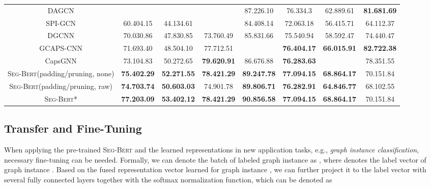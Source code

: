 \documentclass{article}
\newcommand{\our}{\textsc{Seg-Bert}}
\begin{document}
\begin{table*}[t]
\begin{tabular}{c|c|c|c|c|c|c|c}
\hline

DAGCN {\scriptsize \cite{Chen_Dual_19}}	&&&&87.226.10	&76.334.3	&62.889.61	&\textbf{81.681.69}\\

SPI-GCN {\scriptsize \cite{SPIGCN}} &60.404.15	&44.134.61	&	&84.408.14	&72.063.18	&56.415.71	&64.112.37\\

DGCNN {\scriptsize \cite{Zhang2018AnED}} &70.030.86&47.830.85 &73.760.49&85.831.66&75.540.94&58.592.47&74.440.47 \\

GCAPS-CNN {\scriptsize \cite{verma2018graph}} &71.693.40 &48.504.10 &77.712.51&&\textbf{76.404.17}&\textbf{66.015.91}&\textbf{82.722.38} \\

CapsGNN {\scriptsize \cite{xinyi2018capsule}} &73.104.83 &50.272.65 &\textbf{79.620.91}&86.676.88&\textbf{76.283.63}&&78.351.55 \\

\hline



{\our}(padding/pruning, none) &\textbf{75.402.29}&\textbf{52.271.55}&\textbf{78.421.29}&\textbf{89.247.78}&\textbf{77.094.15}&\textbf{68.864.17}&70.151.84 \\

{\our}(padding/pruning, raw) &\textbf{74.703.74}&\textbf{50.603.03}&74.901.78&\textbf{89.806.71}&\textbf{76.282.91}&\textbf{64.846.77}&68.102.55 \\

\hline

{\our}* &\textbf{77.203.09}&\textbf{53.402.12}&\textbf{78.421.29}&\textbf{90.856.58}&\textbf{77.094.15}&\textbf{68.864.17}&70.151.84\\

\hline
\end{tabular}
\vspace{-15pt}
\end{table*}


\subsection{Transfer and Fine-Tuning}

When applying the pre-trained {\our} and the learned representations in new application tasks, e.g., \textit{graph instance classification}, necessary fine-tuning can be needed. Formally, we can denote the batch of labeled graph instance as , where  denotes the label vector of graph instance . Based on the fused representation vector  learned for graph instance , we can further project it to the label vector with several fully connected layers together with the softmax normalization function, which can be denoted as
\end{document}
